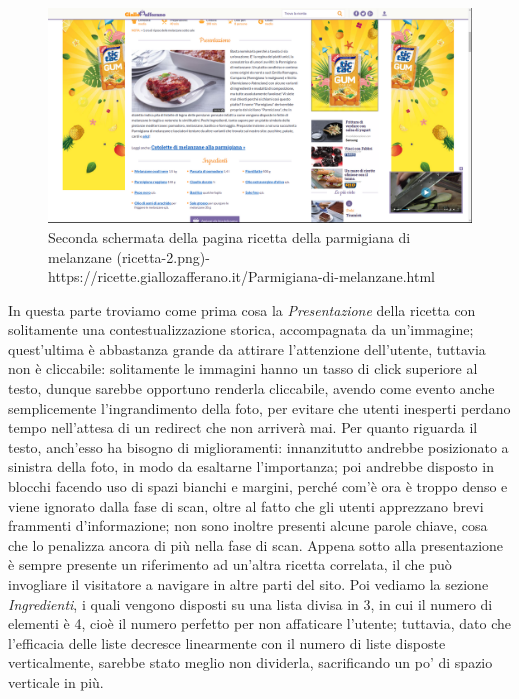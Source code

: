 \begin{figure}[h!]
	\centerline{
	\includegraphics[scale=0.2]{images/ricetta-2.png}}
	\caption{Seconda schermata della pagina ricetta della parmigiana di melanzane (ricetta-2.png)-\newline https://ricette.giallozafferano.it/Parmigiana-di-melanzane.html}
	\label{fig:ricetta-2}
\end{figure}

In questa parte troviamo come prima cosa la \textit{Presentazione} della ricetta con solitamente una contestualizzazione storica, accompagnata da un'immagine; quest'ultima è abbastanza grande da attirare l'attenzione dell'utente, tuttavia non è cliccabile: solitamente le immagini hanno un tasso di click superiore al testo, dunque sarebbe opportuno renderla cliccabile, avendo come evento anche semplicemente l'ingrandimento della foto, per evitare che utenti inesperti perdano tempo nell'attesa di un redirect che non arriverà mai.
Per quanto riguarda il testo, anch'esso ha bisogno di miglioramenti: innanzitutto andrebbe posizionato a sinistra della foto, in modo da esaltarne l'importanza; poi andrebbe disposto in blocchi facendo uso di spazi bianchi e margini, perché com'è ora è troppo denso e viene ignorato dalla fase di scan, oltre al fatto che gli utenti apprezzano brevi frammenti d'informazione; non sono inoltre presenti alcune parole chiave, cosa che lo penalizza ancora di più nella fase di scan.
Appena sotto alla presentazione è sempre presente un riferimento ad un'altra ricetta correlata, il che può invogliare il visitatore a navigare in altre parti del sito.
Poi vediamo la sezione \textit{Ingredienti}, i quali vengono disposti su una lista divisa in 3, in cui il numero di elementi è 4, cioè il numero perfetto per non affaticare l'utente; tuttavia, dato che l'efficacia delle liste  decresce linearmente con il numero di liste disposte verticalmente, sarebbe stato meglio non dividerla, sacrificando un po' di spazio verticale in più.
\clearpage

